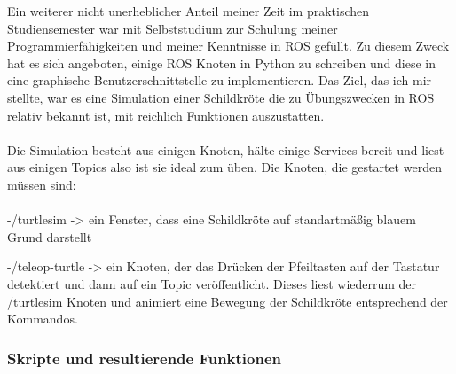 \documentclass[11pt]{scrartcl}
\begin{document}
\begin{onehalfspace}
Ein weiterer nicht unerheblicher Anteil meiner Zeit im praktischen Studiensemester war mit Selbststudium zur Schulung meiner Programmierfähigkeiten und meiner Kenntnisse in ROS gefüllt. Zu diesem Zweck hat es sich angeboten, einige ROS Knoten in Python zu schreiben und diese in eine graphische Benutzerschnittstelle zu implementieren. Das Ziel, das ich mir stellte, war es eine Simulation einer Schildkröte die zu Übungszwecken in ROS relativ bekannt ist, mit reichlich Funktionen auszustatten.\\\\
Die Simulation besteht aus einigen Knoten, hälte einige Services bereit und liest aus einigen Topics also ist sie ideal zum üben. Die Knoten, die gestartet werden müssen sind:\\\\
-/turtlesim  -> ein Fenster, dass eine Schildkröte auf standartmäßig blauem Grund darstellt


-/teleop-turtle  -> ein Knoten, der das Drücken der Pfeiltasten auf der Tastatur detektiert und dann auf ein Topic veröffentlicht. Dieses liest wiederrum der /turtlesim Knoten und animiert eine Bewegung der Schildkröte entsprechend der Kommandos.

\subsubsection{Skripte und resultierende Funktionen}


\end{onehalfspace}
\end{document}
